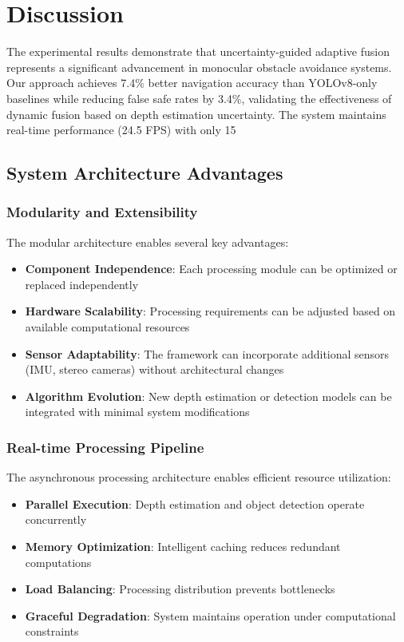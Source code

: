 \documentclass[12pt,oneside]{book}
\begin{document}
\section{Discussion}

The experimental results demonstrate that uncertainty-guided adaptive fusion represents a significant advancement in monocular obstacle avoidance systems. Our approach achieves 7.4\% better navigation accuracy than YOLOv8-only baselines while reducing false safe rates by 3.4\%, validating the effectiveness of dynamic fusion based on depth estimation uncertainty. The system maintains real-time performance (24.5 FPS) with only 15%

\subsection{System Architecture Advantages}

\subsubsection{Modularity and Extensibility}

The modular architecture enables several key advantages:

\begin{itemize}
\item \textbf{Component Independence}: Each processing module can be optimized or replaced independently
\item \textbf{Hardware Scalability}: Processing requirements can be adjusted based on available computational resources
\item \textbf{Sensor Adaptability}: The framework can incorporate additional sensors (IMU, stereo cameras) without architectural changes
\item \textbf{Algorithm Evolution}: New depth estimation or detection models can be integrated with minimal system modifications
\end{itemize}

\subsubsection{Real-time Processing Pipeline}

The asynchronous processing architecture enables efficient resource utilization:

\begin{itemize}
\item \textbf{Parallel Execution}: Depth estimation and object detection operate concurrently
\item \textbf{Memory Optimization}: Intelligent caching reduces redundant computations
\item \textbf{Load Balancing}: Processing distribution prevents bottlenecks
\item \textbf{Graceful Degradation}: System maintains operation under computational constraints
\end{itemize}
\end{document}
